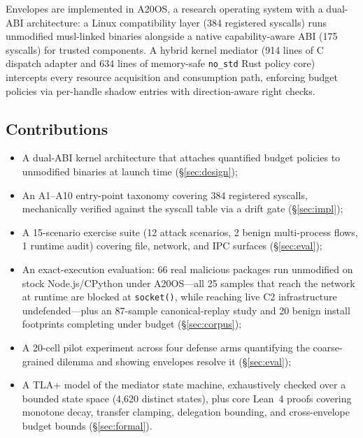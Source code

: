 \documentclass[letterpaper,twocolumn,10pt]{article}
\begin{document}
Envelopes are implemented in A20OS, a research operating system with a
dual-ABI architecture: a Linux compatibility layer (384 registered
syscalls) runs unmodified musl-linked binaries alongside a native
capability-aware ABI (175 syscalls) for trusted components.  A hybrid
kernel mediator (914 lines of C dispatch adapter and 634 lines of
memory-safe \texttt{no\_std} Rust policy core) intercepts every resource
acquisition and consumption path, enforcing budget policies via
per-handle shadow entries with direction-aware right checks.

\subsection{Contributions}

\begin{itemize}
\item A dual-ABI kernel architecture that attaches quantified budget
      policies to unmodified binaries at launch time (\S\ref{sec:design});
\item An A1--A10 entry-point taxonomy covering 384 registered syscalls,
      mechanically verified against the syscall table via a drift gate
      (\S\ref{sec:impl});
\item A 15-scenario exercise suite (12 attack scenarios, 2 benign
      multi-process flows, 1 runtime audit) covering file, network,
      and IPC surfaces (\S\ref{sec:eval});
\item An exact-execution evaluation: 66 real malicious packages run
      unmodified on stock Node.js/CPython under A20OS---all 25 samples
      that reach the network at runtime are blocked at
      \texttt{socket()}, while reaching live C2 infrastructure
      undefended---plus an 87-sample canonical-replay study and 20
      benign install footprints completing under budget
      (\S\ref{sec:corpus});
\item A 20-cell pilot experiment across four defense arms quantifying
      the coarse-grained dilemma and showing envelopes resolve it
      (\S\ref{sec:eval});
\item A TLA+ model of the mediator state machine, exhaustively checked
      over a bounded state space (4{,}620 distinct states), plus core
      Lean~4 proofs covering monotone decay, transfer clamping, delegation bounding, and cross-envelope budget bounds
      (\S\ref{sec:formal}).
\end{itemize}

\end{document}
